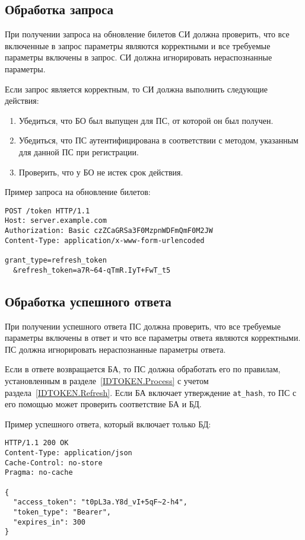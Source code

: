 \label{REQRESP.Refresh}

\subsection{Обработка запроса}\label{REQRESP.Refresh.Req}

При получении запроса на обновление билетов СИ должна проверить, что все 
включенные в запрос параметры являются корректными и все требуемые параметры 
включены в запрос.
%
СИ должна игнорировать нераспознанные параметры.

Если запрос является корректным, то СИ должна выполнить следующие действия:
\begin{enumerate}
\item 
Убедиться, что БО был выпущен для ПС, от которой он был получен.

\item 
Убедиться, что ПС аутентифицирована в соответствии с методом, указанным 
для данной ПС при регистрации.

\item 
Проверить, что у БО не истек срок действия.
\end{enumerate}

Пример запроса на обновление билетов:
\begin{lstlisting}
POST /token HTTP/1.1
Host: server.example.com
Authorization: Basic czZCaGRSa3F0MzpnWDFmQmF0M2JW
Content-Type: application/x-www-form-urlencoded

grant_type=refresh_token
  &refresh_token=a7R~64-qTmR.IyT+FwT_t5
\end{lstlisting}

\subsection{Обработка успешного ответа}\label{REQRESP.Refresh.Resp}

При получении успешного ответа ПС должна проверить, что все
требуемые параметры включены в ответ и что все параметры ответа являются
корректными. ПС должна игнорировать нераспознанные параметры ответа.

Если в ответе возвращается БА, то ПС должна обработать его по правилам, 
установленным в разделе~\ref{IDTOKEN.Process} с учетом раздела~\ref{IDTOKEN.Refresh}. 
%
Если БА включает утверждение \lstinline{at_hash}, то ПС с его помощью 
может проверить соответствие БА и БД.

Пример успешного ответа, который включает только БД:
%
\begin{lstlisting}
HTTP/1.1 200 OK
Content-Type: application/json
Cache-Control: no-store
Pragma: no-cache

{
  "access_token": "t0pL3a.Y8d_vI+5qF~2-h4",
  "token_type": "Bearer",
  "expires_in": 300
}
\end{lstlisting}

